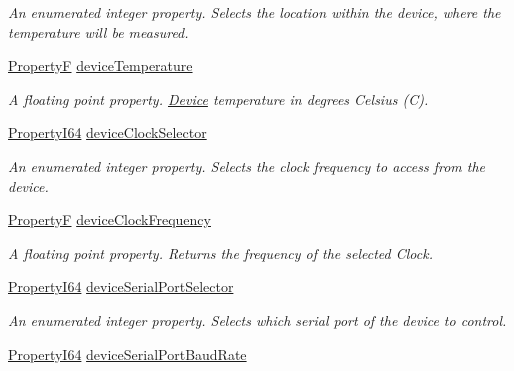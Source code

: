 \begin{DoxyCompactItemize}
\begin{DoxyCompactList}\small\item\em An enumerated integer property. Selects the location within the device, where the temperature will be measured. \end{DoxyCompactList}\item 
\hyperlink{group___common_interface_gaf54865fe5a3d5cfd15f9a111b40d09f9}{Property\+F} \hyperlink{classmv_i_m_p_a_c_t_1_1acquire_1_1_gen_i_cam_1_1_device_control_ae76cb8bd59c648976155dcfd93c03bd4}{device\+Temperature}
\begin{DoxyCompactList}\small\item\em A floating point property. \hyperlink{classmv_i_m_p_a_c_t_1_1acquire_1_1_device}{Device} temperature in degrees Celsius (C). \end{DoxyCompactList}\item 
\hyperlink{group___common_interface_ga81749b2696755513663492664a18a893}{Property\+I64} \hyperlink{classmv_i_m_p_a_c_t_1_1acquire_1_1_gen_i_cam_1_1_device_control_a6dad6390da7a4e7914a3381b7139efb0}{device\+Clock\+Selector}
\begin{DoxyCompactList}\small\item\em An enumerated integer property. Selects the clock frequency to access from the device. \end{DoxyCompactList}\item 
\hyperlink{group___common_interface_gaf54865fe5a3d5cfd15f9a111b40d09f9}{Property\+F} \hyperlink{classmv_i_m_p_a_c_t_1_1acquire_1_1_gen_i_cam_1_1_device_control_acd853c8c3a5cbe828d9c7f130224b2e1}{device\+Clock\+Frequency}
\begin{DoxyCompactList}\small\item\em A floating point property. Returns the frequency of the selected Clock. \end{DoxyCompactList}\item 
\hyperlink{group___common_interface_ga81749b2696755513663492664a18a893}{Property\+I64} \hyperlink{classmv_i_m_p_a_c_t_1_1acquire_1_1_gen_i_cam_1_1_device_control_aff5c54a3673e4ccdbe44380b0ac7dbcc}{device\+Serial\+Port\+Selector}
\begin{DoxyCompactList}\small\item\em An enumerated integer property. Selects which serial port of the device to control. \end{DoxyCompactList}\item 
\hyperlink{group___common_interface_ga81749b2696755513663492664a18a893}{Property\+I64} \hyperlink{classmv_i_m_p_a_c_t_1_1acquire_1_1_gen_i_cam_1_1_device_control_a690a42781160cda6d9862185868a27ec}{device\+Serial\+Port\+Baud\+Rate}

\end{DoxyCompactItemize}
